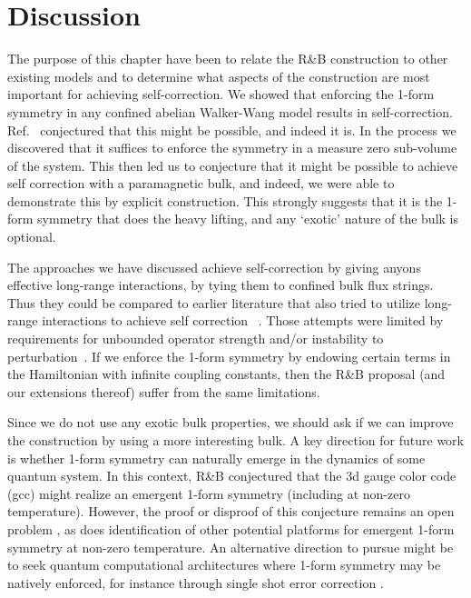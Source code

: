 \section{Discussion}

The  purpose of this chapter have been to relate the R\&B construction to other existing models and to determine what aspects of the construction are most important for achieving self-correction. We showed that enforcing the 1-form symmetry in any confined abelian Walker-Wang model results in self-correction. Ref.~\cite{RobertsBartlett2020} conjectured that this might be possible, and indeed it is. In the process we discovered that it suffices to enforce the symmetry in a measure zero sub-volume of the system. This then led us to conjecture that it might be possible to achieve self correction with a paramagnetic bulk, and indeed, we were able to demonstrate this by explicit construction. This strongly suggests that it is the 1-form symmetry that does the heavy lifting, and any `exotic' nature of the bulk is optional. 

The approaches we have discussed achieve self-correction by giving anyons effective long-range interactions, by tying them to confined bulk flux strings. Thus they could be compared to earlier literature that also tried to utilize long-range interactions to achieve self correction ~\cite{Hamma2009Toric, Chesi2010Self, Pedrocchi2011Memory, Hutter2012Self, Wootton2013Topological, Becker2013Dynamic, Pedrocchi2013Thermal, Hutter2014Effective}.
Those attempts were limited by requirements for unbounded operator strength and/or instability to perturbation~\cite{Brown2016Finite, LandonCardinal2015}. If we enforce the 1-form symmetry by endowing certain terms in the Hamiltonian with infinite coupling constants, then the R\&B proposal (and our extensions thereof) suffer from the same limitations. 

Since we do not use any exotic bulk properties, we should ask if we can improve the construction by using a more interesting bulk.
A key direction for future work is  whether 1-form symmetry can naturally emerge in the dynamics of some quantum system. In this context, R\&B conjectured that the 3d gauge color code~\cite{Bombin2015Gauge} (gcc) might realize an emergent 1-form symmetry (including at non-zero temperature). However, the proof or disproof of this conjecture remains an open problem \cite{Kubica2018Ungauging}, as does identification of other potential platforms for emergent 1-form symmetry at non-zero temperature. An alternative direction to pursue might be to seek quantum computational architectures where 1-form symmetry may be natively enforced, for instance through single shot error correction \cite{Roberts2017SPTO, Bombin2015SingleShot}. 

